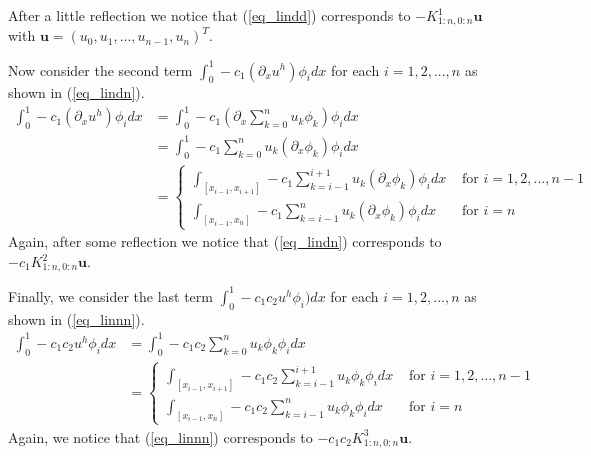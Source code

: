 \documentclass[11pt,fleqn]{article}
\theoremstyle{defstyle}
\begin{document}
After a little reflection we notice that (\ref{eq_lindd}) corresponds to $-K^1_{1:n, 0:n}\mathbf{u}$ with $\mathbf{u} = \left(u_0, u_1,...,u_{n-1}, u_n \right)^T$. 

Now consider the second term $\int_0^1  -c_1(\partial_xu^h)\phi_idx$  for each $i=1,2,...,n$ as shown in (\ref{eq_lindn}).
\begin{equation}
\begin{aligned}
\int_0^1 -c_1(\partial_xu^h)\phi_idx &= \int_0^1 - c_1(\partial_x \sum_{k=0}^{n} u_k\phi_k)\phi_i dx \\
&= \int_0^1 -c_1\sum_{k=0}^{n} u_k(\partial_x\phi_k)\phi_idx \\
&= \begin{cases}
\int_{[x_{i-1},x_{i+1}]}-c_1\sum_{k=i-1}^{i+1} u_k(\partial_x\phi_k)\phi_idx &\text{ for } i=1,2,..., n-1 \\
\int_{[x_{i-1},x_{n}]}-c_1\sum_{k=i-1}^{n} u_k(\partial_x\phi_k)\phi_idx &\text{ for } i=n
\end{cases}
\end{aligned}
\label{eq_lindn}
\end{equation}
Again, after some reflection we notice that (\ref{eq_lindn}) corresponds to $-c_1K^2_{1:n, 0:n}\mathbf{u}$. 

Finally, we consider the last term $\int_0^1 - c_1c_2u^h\phi_i)dx$ for each $i=1,2,...,n$ as shown in (\ref{eq_linnn}).
\begin{equation}
\begin{aligned}
\int_0^1 -c_1c_2u^h\phi_idx &= \int_0^1 - c_1c_2\sum_{k=0}^{n} u_k\phi_k\phi_i dx \\
&= \begin{cases}
\int_{[x_{i-1},x_{i+1}]}-c_1c_2\sum_{k=i-1}^{i+1} u_k\phi_k\phi_idx &\text{ for } i=1,2,..., n-1 \\
\int_{[x_{i-1},x_{n}]}-c_1c_2\sum_{k=i-1}^{n} u_k\phi_k\phi_idx &\text{ for } i=n
\end{cases}
\end{aligned}
\label{eq_linnn}
\end{equation}
Again, we notice that (\ref{eq_linnn}) corresponds to $-c_1c_2K^3_{1:n, 0:n}\mathbf{u}$.
\end{document}

